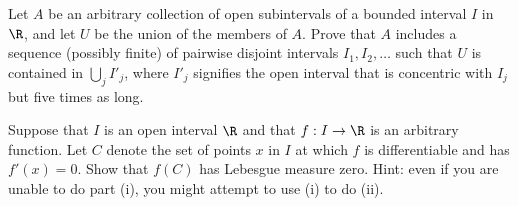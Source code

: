 \begin{alist}
\item Let $A$ be an arbitrary collection of open subintervals of a
bounded interval $I$ in $\R$, and let $U$ be the union of the members
of $A$. Prove that $A$ includes a sequence (possibly finite) of
pairwise disjoint intervals $I_1,I_2,\ldots $ such that $U$ is
contained in $\bigcup_jI'_j $, where $I'_j$ signifies the open
interval that is concentric with $I_j$ but five times as long.
\item Suppose that $I$ is an open interval $\R$ and that
$f:I\rightarrow \R$ is an arbitrary function. Let $C$ denote the set
of points $x$ in $I$ at which $f$ is differentiable and has $f'(x)=0$.
Show that $f(C)$ has Lebesgue measure zero. Hint: even if you are unable
to do part (i), you might attempt to use (i) to do (ii).
\end{alist}
